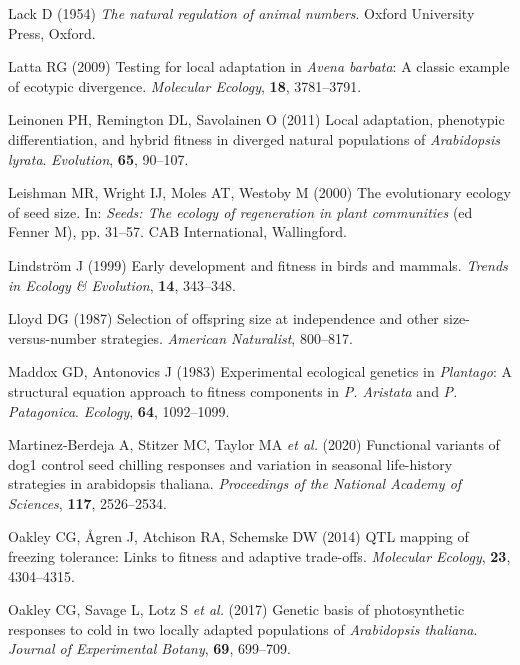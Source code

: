 \documentclass[]{article}
\begin{document}
\leavevmode\hypertarget{ref-Lack1954}{}%
Lack D (1954) \emph{The natural regulation of animal numbers}. Oxford University Press, Oxford.

\leavevmode\hypertarget{ref-Latta2009}{}%
Latta RG (2009) Testing for local adaptation in \emph{Avena barbata}: A classic example of ecotypic divergence. \emph{Molecular Ecology}, \textbf{18}, 3781--3791.

\leavevmode\hypertarget{ref-leinonen2011local}{}%
Leinonen PH, Remington DL, Savolainen O (2011) Local adaptation, phenotypic differentiation, and hybrid fitness in diverged natural populations of \emph{Arabidopsis lyrata}. \emph{Evolution}, \textbf{65}, 90--107.

\leavevmode\hypertarget{ref-Leishman2000}{}%
Leishman MR, Wright IJ, Moles AT, Westoby M (2000) The evolutionary ecology of seed size. In: \emph{Seeds: The ecology of regeneration in plant communities} (ed Fenner M), pp. 31--57. CAB International, Wallingford.

\leavevmode\hypertarget{ref-lindstrom1999early}{}%
Lindström J (1999) Early development and fitness in birds and mammals. \emph{Trends in Ecology \& Evolution}, \textbf{14}, 343--348.

\leavevmode\hypertarget{ref-Lloyd1987}{}%
Lloyd DG (1987) Selection of offspring size at independence and other size-versus-number strategies. \emph{American Naturalist}, 800--817.

\leavevmode\hypertarget{ref-Maddox1983}{}%
Maddox GD, Antonovics J (1983) Experimental ecological genetics in \emph{Plantago}: A structural equation approach to fitness components in \emph{P. Aristata} and \emph{P. Patagonica}. \emph{Ecology}, \textbf{64}, 1092--1099.

\leavevmode\hypertarget{ref-martinez2020functional}{}%
Martinez-Berdeja A, Stitzer MC, Taylor MA \emph{et al.} (2020) Functional variants of dog1 control seed chilling responses and variation in seasonal life-history strategies in arabidopsis thaliana. \emph{Proceedings of the National Academy of Sciences}, \textbf{117}, 2526--2534.

\leavevmode\hypertarget{ref-oakley2014qtl}{}%
Oakley CG, Ågren J, Atchison RA, Schemske DW (2014) QTL mapping of freezing tolerance: Links to fitness and adaptive trade-offs. \emph{Molecular Ecology}, \textbf{23}, 4304--4315.

\leavevmode\hypertarget{ref-oakley2017genetic}{}%
Oakley CG, Savage L, Lotz S \emph{et al.} (2017) Genetic basis of photosynthetic responses to cold in two locally adapted populations of \emph{Arabidopsis thaliana}. \emph{Journal of Experimental Botany}, \textbf{69}, 699--709.
\end{document}

